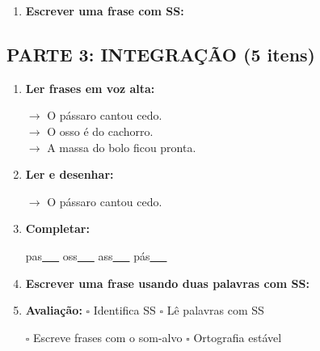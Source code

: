 \begin{exercicio}
\begin{enumerate}[resume]
  \item \textbf{Escrever uma frase com SS:}
  \begin{center}
  \underline{\hspace{12cm}}
  \end{center}

\end{enumerate}

\subsection*{PARTE 3: INTEGRAÇÃO (5 itens)}

\begin{enumerate}[resume]

  \item \textbf{Ler frases em voz alta:}
  \begin{center}
  $\rightarrow$ O pássaro cantou cedo.\\
  $\rightarrow$ O osso é do cachorro.\\
  $\rightarrow$ A massa do bolo ficou pronta.\\
  \end{center}

  \item \textbf{Ler e desenhar:}
  \begin{center}
  $\rightarrow$ O pássaro cantou cedo.
  \end{center}
  \begin{center}
  \end{center}

  \item \textbf{Completar:}
  \begin{center}
  pas\underline{~~~} \quad oss\underline{~~~} \quad ass\underline{~~~} \quad pás\underline{~~~}
  \end{center}

  \item \textbf{Escrever uma frase usando duas palavras com SS:}
  \begin{center}
  \underline{\hspace{12cm}}
  \end{center}

  \item \textbf{Avaliação:} $\square$ Identifica SS \quad $\square$ Lê palavras com SS
  \begin{center}
  $\square$ Escreve frases com o som-alvo \quad $\square$ Ortografia estável
  \end{center}


\end{enumerate}
\end{exercicio}
